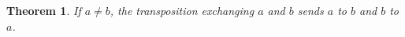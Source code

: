 \documentclass{article}
\newtheorem{theorem}{Theorem}
\begin{document}
\begin{theorem}\label{thm:R02}
If $a\ne b$, the transposition exchanging $a$ and $b$ sends $a$ to $b$ and $b$ to $a$.
\end{theorem}
\end{document}
